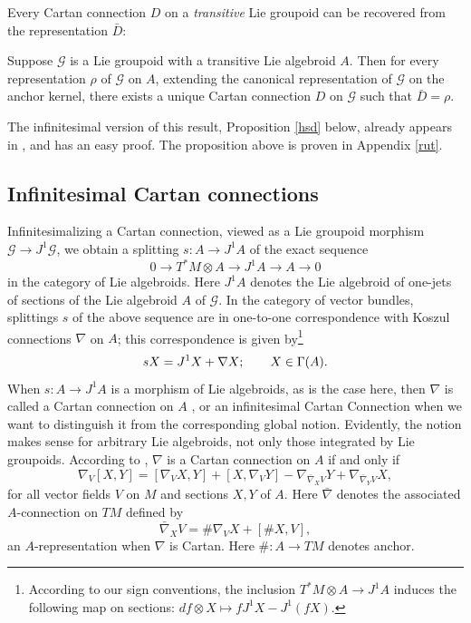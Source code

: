 \documentclass[leqno,12pt]{amsart} %
\begin{document}
Every Cartan connection $D$ on a {\em transitive} Lie groupoid can be recovered from the
representation $\bar D$:

\begin{proposition}
  Suppose ${\mathcal G} $ is a Lie groupoid with a transitive Lie algebroid $A$. Then for
  every representation $\rho $ of ${\mathcal G} $ on $A$, extending the canonical
  representation of ${\mathcal G} $ on the anchor kernel, there exists a unique Cartan
  connection $D$ on ${\mathcal G} $ such that $\bar D = \rho $.
\end{proposition}
\noindent%
The infinitesimal version of this result, Proposition \ref{hsd} below, already appears in
\cite{Blaom_06}, and has an easy proof. The proposition above is proven in Appendix
\ref{rut}.


\subsection{Infinitesimal Cartan connections}%
Infinitesimalizing a Cartan connection, viewed as a Lie groupoid
morphism ${\mathcal G} \rightarrow J^1 {\mathcal G}$, we obtain a splitting $s
\colon A \rightarrow J^1 A $ of the exact
sequence
\begin{equation}\label{spliteroo}
  0\longrightarrow T^*\!M\otimes A\longrightarrow J^1A\longrightarrow A\longrightarrow 0
\end{equation}
in the category of Lie algebroids. Here $J^1 A $ denotes the Lie algebroid of one-jets of
sections of the Lie algebroid $A $ of ${\mathcal G}$. In the category of vector bundles, splittings
$s$ of the above sequence are in one-to-one correspondence with Koszul connections
$\nabla$ on $A$; this correspondence is given by\footnote{According to our sign
  conventions, the inclusion $T^*\!M \otimes A \rightarrow J^1 A $ induces the following
  map on sections: $df \otimes X \mapsto f J^1 X - J^1 (f X)$.}
\begin{equation}
  sX = J^1 X + \nabla X; \qquad  X \in \Gamma(A). \mathlab{cspan}
\end{equation}
When $s \colon A \rightarrow J^1 A $ is a morphism of Lie algebroids, as is the case here,
then $\nabla $ is called a {\df Cartan connection} on $A$ \cite{Blaom_06}, or an {\df
  infinitesimal Cartan Connection} when we want to distinguish it from the corresponding
global notion. Evidently, the notion makes sense for arbitrary Lie algebroids, not only
those integrated by Lie groupoids. According to \cite{Blaom_06}, $\nabla $ is a Cartan
connection on $A$ if and only if
\begin{equation*}
  \nabla_V[X, Y] = [\nabla_VX,
        Y]+[X,\nabla_VY]-\nabla_{\bar\nabla_XV}Y+\nabla_{\bar\nabla_YV}X,
\end{equation*}
for all vector fields $V$ on $M$ and sections $X, Y$ of $A$. Here $\bar\nabla$ denotes the
associated $A$-connection on $TM$ defined by
\begin{equation}
 \bar\nabla_XV= \#\nabla_VX +[\#X, V],
\end{equation}
an $A$-representation when $\nabla $ is Cartan. Here $\# \colon A \rightarrow TM$
denotes anchor.
\end{document}
